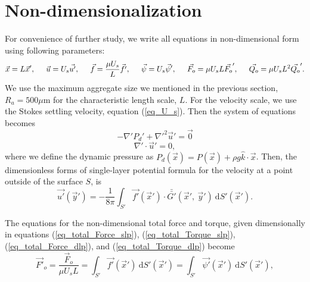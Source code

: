 \section{Non-dimensionalization}
For convenience of further study, we write all equations in non-dimensional form using following parameters:
\begin{equation}
\vec{x} = L\vec{x}', 
 \hspace{0.5cm} 
 \vec{u} = U_s \vec{u'},
 \hspace{0.5cm}
  \vec{f} = \frac{\mu U_s}{L} \vec{f'},
  \hspace{0.5cm}
  \vec{\psi} = U_s \vec{\psi}',
  \hspace{0.5cm}
  \vec{F_o} = \mu U_s L \vec{F_o}',
  \hspace{0.5cm}
  \vec{Q_o} = \mu U_s L^2 \vec{Q_o}'.
\label{eq_nonD}
\end{equation}
We use the maximum aggregate size we mentioned in the previous section, $R_a = 500 \mu$m for the characteristic length scale, $L$. For the velocity scale, we use the Stokes settling velocity, equation (\ref{eq_U_s}). 
Then the system of equations becomes
\begin{equation}
    -\nabla' P_d' +  \nabla'^2 \vec{u}'  = \vec{0}
	\label{eq_momentum_noD}
\end{equation}
\begin{equation}
    \nabla' \cdot \vec{u}' = 0,
	\label{eq_conti_noD}
\end{equation}
where we define the dynamic pressure as 
$P_d(\vec{x}) =  P(\vec{x}) + \rho g \hat{k} \cdot \vec{x}$.
Then, the dimensionless forms of single-layer potential formula for the velocity at a point outside of the surface $S$, is 
\begin{equation}
    \vec{u'}(\vec{y}') =
	- \frac{1}{8 \pi}
	\int_{S'}  \vec{f'}(\vec{x}') \cdot \bar{\bar{G'}}(\vec{x}', \ \vec{y}') \ \text{d}S'(\vec{x}').
    \label{eq_single_nonD}
\end{equation}
\par
The equations for the non-dimensional total force and torque, given dimensionally in equations (\ref{eq_total_Force_slp}),  (\ref{eq_total_Torque_slp}),  (\ref{eq_total_Force_dlp}), and (\ref{eq_total_Torque_dlp})
become
\begin{equation}
 \vec{F'}_o = \frac{\vec{F}_o}{\mu U_s L} =
  \int_{S'} \vec{f'}(\vec{x}') \  \text{d}S'(\vec{x}')
 =\int_{S'}  \vec{\psi'}( \vec{x}') \ \text{d}S'(\vec{x}'),
 \label{eq_total_Force_noD}
 \end{equation} 
